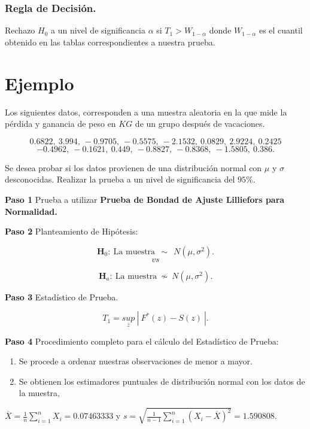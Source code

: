 \documentclass[
  a4paper,
  oneside,
  openany]{book}
\begin{document}
\hypertarget{regla-de-decisiuxf3n.-1}{%
\subsubsection*{Regla de Decisión.}\label{regla-de-decisiuxf3n.-1}}


Rechazo \(H_0\) a un nivel de significancia \(\alpha\) si \(T_{1}> W_{1-\alpha}\) donde \(W_{1-\alpha}\) es el cuantil obtenido en las tablas correspondientes a nuestra prueba.

\hypertarget{ejemplo-14}{%
\section{Ejemplo}\label{ejemplo-14}}

Los siguientes datos, corresponden a una muestra aleatoria en la que mide la pérdida y ganancia de peso en \(KG\) de un grupo después de vacaciones.

\[0.6822,\ 3.994,\ -0.9705,\ -0.5575,\ -2.1532,\ 0.0829,\ 2.9224,\ 0.2425\]
\[-0.4962,\ -0.1621,\ 0.449,\ -0.8827,\ -0.8368,\ -1.5805,\ 0.386.\]

Se desea probar si los datos provienen de una distribución normal con \(\mu\) y \(\sigma\) desconocidas.
Realizar la prueba a un nivel de significancia del \(95\%.\)

\textbf{Paso 1} Prueba a utilizar \textbf{Prueba de Bondad de Ajuste Lilliefors para Normalidad.}

\textbf{Paso 2} Planteamiento de Hipótesis:

\[\textbf{H}_0: \ \mbox{La muestra} \ \ \sim \ \  N(\mu,\sigma^2).\]
\[vs\]

\[\textbf{H}_a: \ \mbox{La muestra}  \ \nsim \  N(\mu,\sigma^2).\]

\textbf{Paso 3} Estadístico de Prueba.

\[T_{1}=\underset{z}{sup} \ | \ F^*(z)-S(z) \ |.\]

\textbf{Paso 4} Procedimiento completo para el cálculo del Estadístico de Prueba:

\begin{enumerate}
\def\labelenumi{\arabic{enumi})}
\item
  Se procede a ordenar nuestras observaciones de menor a mayor.
\item
  Se obtienen los estimadores puntuales de distribución normal con los datos de la muestra,
\end{enumerate}

\(\overline{X}=\frac{1}{n}\sum_{i=1}^{n}X_{i}= 0.07463333\) y \(s=\sqrt{\frac{1}{n-1}\sum_{i=1}^{n}(X_{i}-\overline{X})^2}=1.590808.\)
\end{document}
